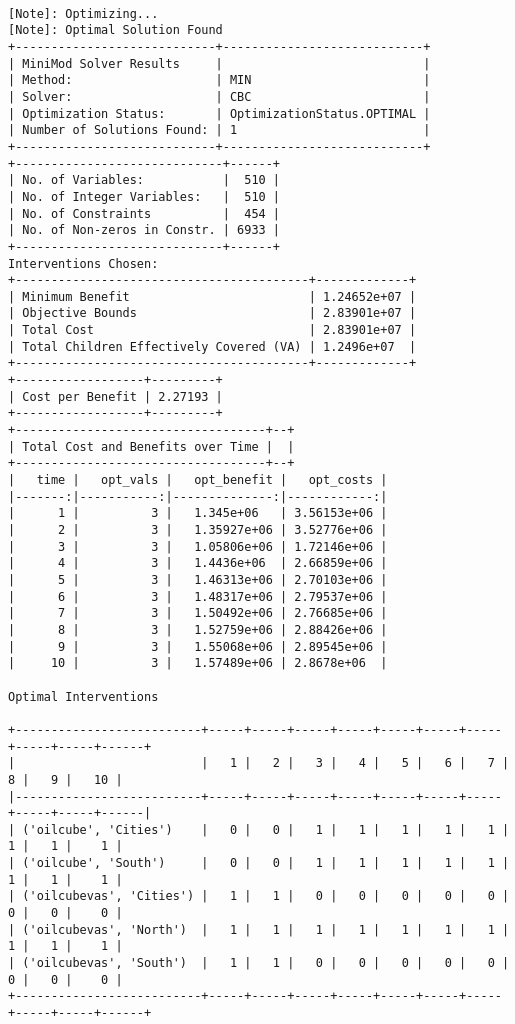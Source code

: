 \documentclass[
]{article}
\begin{document}
\begin{verbatim}
                
[Note]: Optimizing...
[Note]: Optimal Solution Found
+----------------------------+----------------------------+
| MiniMod Solver Results     |                            |
| Method:                    | MIN                        |
| Solver:                    | CBC                        |
| Optimization Status:       | OptimizationStatus.OPTIMAL |
| Number of Solutions Found: | 1                          |
+----------------------------+----------------------------+
+-----------------------------+------+
| No. of Variables:           |  510 |
| No. of Integer Variables:   |  510 |
| No. of Constraints          |  454 |
| No. of Non-zeros in Constr. | 6933 |
+-----------------------------+------+
Interventions Chosen:
+-----------------------------------------+-------------+
| Minimum Benefit                         | 1.24652e+07 |
| Objective Bounds                        | 2.83901e+07 |
| Total Cost                              | 2.83901e+07 |
| Total Children Effectively Covered (VA) | 1.2496e+07  |
+-----------------------------------------+-------------+
+------------------+---------+
| Cost per Benefit | 2.27193 |
+------------------+---------+
+-----------------------------------+--+
| Total Cost and Benefits over Time |  |
+-----------------------------------+--+
|   time |   opt_vals |   opt_benefit |   opt_costs |
|-------:|-----------:|--------------:|------------:|
|      1 |          3 |   1.345e+06   | 3.56153e+06 |
|      2 |          3 |   1.35927e+06 | 3.52776e+06 |
|      3 |          3 |   1.05806e+06 | 1.72146e+06 |
|      4 |          3 |   1.4436e+06  | 2.66859e+06 |
|      5 |          3 |   1.46313e+06 | 2.70103e+06 |
|      6 |          3 |   1.48317e+06 | 2.79537e+06 |
|      7 |          3 |   1.50492e+06 | 2.76685e+06 |
|      8 |          3 |   1.52759e+06 | 2.88426e+06 |
|      9 |          3 |   1.55068e+06 | 2.89545e+06 |
|     10 |          3 |   1.57489e+06 | 2.8678e+06  |

Optimal Interventions

+--------------------------+-----+-----+-----+-----+-----+-----+-----+-----+-----+------+
|                          |   1 |   2 |   3 |   4 |   5 |   6 |   7 |   8 |   9 |   10 |
|--------------------------+-----+-----+-----+-----+-----+-----+-----+-----+-----+------|
| ('oilcube', 'Cities')    |   0 |   0 |   1 |   1 |   1 |   1 |   1 |   1 |   1 |    1 |
| ('oilcube', 'South')     |   0 |   0 |   1 |   1 |   1 |   1 |   1 |   1 |   1 |    1 |
| ('oilcubevas', 'Cities') |   1 |   1 |   0 |   0 |   0 |   0 |   0 |   0 |   0 |    0 |
| ('oilcubevas', 'North')  |   1 |   1 |   1 |   1 |   1 |   1 |   1 |   1 |   1 |    1 |
| ('oilcubevas', 'South')  |   1 |   1 |   0 |   0 |   0 |   0 |   0 |   0 |   0 |    0 |
+--------------------------+-----+-----+-----+-----+-----+-----+-----+-----+-----+------+
\end{verbatim}
\end{document}
